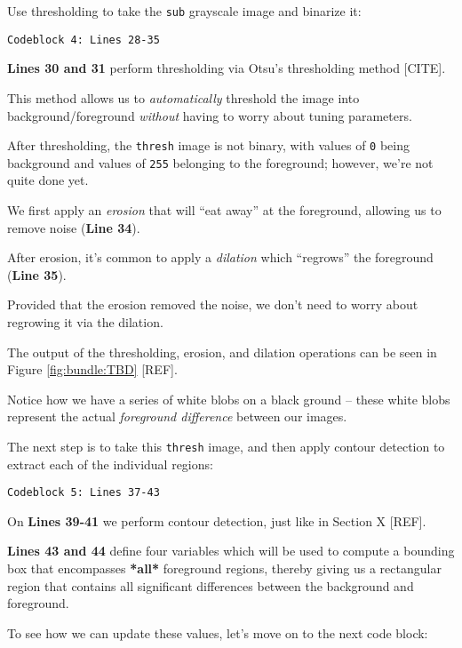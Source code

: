 Use thresholding to take the \texttt{sub} grayscale image and binarize it:

\begin{verbatim}
Codeblock 4: Lines 28-35
\end{verbatim}

\textbf{Lines 30 and 31} perform thresholding via Otsu’s thresholding method [CITE].

This method allows us to \textit{automatically} threshold the image into background/foreground \textit{without} having to worry about tuning parameters.

After thresholding, the \texttt{thresh} image is not binary, with values of \texttt{0} being background and values of \texttt{255} belonging to the foreground; however, we’re not quite done yet.

We first apply an \textit{erosion} that will “eat away” at the foreground, allowing us to remove noise (\textbf{Line 34}).

After erosion, it’s common to apply a \textit{dilation} which “regrows” the foreground (\textbf{Line 35}).

Provided that the erosion removed the noise, we don’t need to worry about regrowing it via the dilation.

The output of the thresholding, erosion, and dilation operations can be seen in Figure \ref{fig:bundle:TBD} [REF].

Notice how we have a series of white blobs on a black ground -- these white blobs represent the actual \textit{foreground difference} between our images.

The next step is to take this \texttt{thresh}  image, and then apply contour detection to extract each of the individual regions:

\begin{verbatim}
Codeblock 5: Lines 37-43
\end{verbatim}

On \textbf{Lines 39-41} we perform contour detection, just like in Section X [REF].

\textbf{Lines 43 and 44} define four variables which will be used to compute a bounding box that encompasses \textbf{*all*} foreground regions, thereby giving us a rectangular region that contains all significant differences between the background and foreground.

To see how we can update these values, let’s move on to the next code block:


